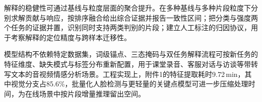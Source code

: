 解释的稳健性可通过基线与粒度层面的聚合提升。在多种基线与多种片段粒度下分别求解贡献与响应，按排序融合给出综合证据并报告一致性区间；把分类与强度两个任务的证据并置，识别同时支持两类判别的片段；建立人工标注的归因协议，用于考察解释的定位精度与跨样本迁移性。

模型结构不依赖特定数据集，词级锚点、三态掩码与双任务解释流程可按新任务的特征维度、缺失模式与标签分布重新配置，用于课堂录音、客服对话与访谈等带转写文本的音视频情感分析场景。工程实现上，附件1的特征提取耗时9.72\,min，其中视觉分支占85.6\%，批量化人脸检测与更轻量的关键点模型可进一步压缩处理时间，为在线场景中按片段增量推理留出空间。
